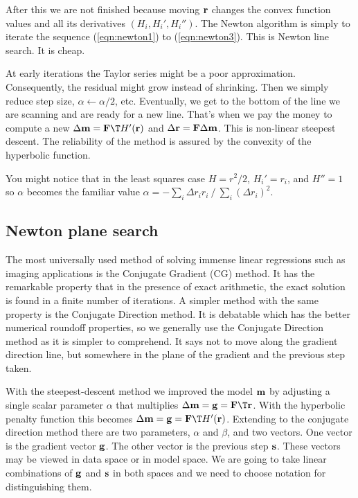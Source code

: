 After this we are not finished because moving $\bold r$
changes the convex function values and all its derivatives
$(H_i, H_i', H_i'')$.
The Newton algorithm is simply to iterate the sequence
(\ref{eqn:newton1}) to
(\ref{eqn:newton3}).
This is Newton line search.  It is cheap.
\par
At early iterations the Taylor series might be a poor approximation.
Consequently, the residual might grow instead of shrinking.
Then we simply reduce step size,
$\alpha\leftarrow\alpha/2$, etc.
Eventually, we get to the bottom of the line we are scanning and are ready for a new line.
That's when we pay the money to compute a new 
$\Delta \bold m = \bold F\T H'(\bold r)$ and
$\Delta \bold r = \bold F \Delta\bold m$.
This is non-linear steepest descent.
The reliability of the method is assured by the convexity of the hyperbolic function.
\par
You might notice that in the least squares case
$H=r^2/2$, $H_i'=r_i$, and $H''=1$
so $\alpha$ becomes the familiar value
$\alpha = - {\sum_i \Delta r_i  r_i }  \ / \ 
            {\sum_i (\Delta r_i)^2 }$.

\subsection{Newton plane search}

\par
The most universally used method of solving
immense linear regressions such as imaging applications
is the Conjugate Gradient (CG) method.
It has the remarkable property that in the presence of exact arithmetic,
the exact solution is found in a finite number of iterations.
A simpler method with the same property is the Conjugate Direction method.
It is debatable which has the better numerical roundoff properties,
so we generally use the Conjugate Direction method as it is simpler to comprehend.
It says not to move along the gradient direction line,
but somewhere in the plane of the gradient and the previous step taken.

\par
With the steepest-descent method we improved
the model $\bold m$ by adjusting a single scalar parameter $\alpha$ that multiplies
$\Delta \bold m= \bold g = \bold F\T\bold r$.
With the hyperbolic penalty function this becomes
$\Delta \bold m= \bold g = \bold F\T H'(\bold r)$.
Extending to the conjugate direction method there are two parameters,
$\alpha$ and $\beta$, and two vectors.
One vector is the gradient vector $\bold g$.
The other vector is the previous step $\bold s$.
These vectors may be viewed in data space or in model space.
We are going to take linear combinations of $\bold g$ and $\bold s$
in both spaces and we need to choose notation for distinguishing them.

